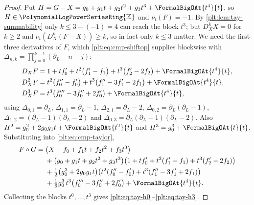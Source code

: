 \documentclass[11pt,oneside]{article}
\theoremstyle{plain}
\theoremstyle{definition}
\theoremstyle{remark}
\newcommand{\K}{\mathbb{K}}
\newcommand{\PLpow}{\PolynomialLogPowerSeriesRing{\K}}   %
\newcommand{\ordt}{\nu_{t}}                              %
\newcommand{\DX}{D_{X}}                                  %
\newcommand{\shiftop}[2]{\Delta_{#1,#2}}                 %
\newcommand{\compose}{\mathbin{\circ}}
\begin{document}
\begin{proof}
Put \(H=G-X=g_{0}+g_{1}t+g_{2}t^{2}+g_{3}t^{3}+\FormalBigOAt{t^{4}}{t}\), so
\(H\in\PLpow\) and \(\ordt(F)=-1\).  By
\cref{plt:lem:tay-summability} only \(k\le 3-(-1)=4\) can reach the block
\(t^{3}\); but \(\DX^{k}X=0\) for \(k\ge2\) and
\(\ordt(\DX^{k}(F-X))\ge k\), so in fact only \(k\le3\) matter.  We need the
first three derivatives of \(F\), which \eqref{plt:eq:cmp-shiftop} supplies
blockwise with \(\shiftop{n}{k}=\prod_{j=0}^{k-1}(\partial_L-n-j)\):
\begin{align*}
 \DX F&=1+t f_{0}'+t^{2}\bigl(f_{1}'-f_{1}\bigr)
        +t^{3}\bigl(f_{2}'-2f_{2}\bigr)+\FormalBigOAt{t^{4}}{t},\\
 \DX^{2}F&=t^{2}\bigl(f_{0}''-f_{0}'\bigr)
        +t^{3}\bigl(f_{1}''-3f_{1}'+2f_{1}\bigr)+\FormalBigOAt{t^{4}}{t},\\
 \DX^{3}F&=t^{3}\bigl(f_{0}'''-3f_{0}''+2f_{0}'\bigr)
        +\FormalBigOAt{t^{4}}{t},
\end{align*}
using \(\shiftop{0}{1}=\partial_L\), \(\shiftop{1}{1}=\partial_L-1\),
\(\shiftop{2}{1}=\partial_L-2\), \(\shiftop{0}{2}=\partial_L(\partial_L-1)\),
\(\shiftop{1}{2}=(\partial_L-1)(\partial_L-2)\) and
\(\shiftop{0}{3}=\partial_L(\partial_L-1)(\partial_L-2)\).  Also
\(H^{2}=g_{0}^{2}+2g_{0}g_{1}t+\FormalBigOAt{t^{2}}{t}\) and
\(H^{3}=g_{0}^{3}+\FormalBigOAt{t}{t}\).  Substituting into
\eqref{plt:eq:cmp-taylor},
\begin{align*}
 F\compose G
 ={}&\bigl(X+f_{0}+f_{1}t+f_{2}t^{2}+f_{3}t^{3}\bigr)\\
 &+\bigl(g_{0}+g_{1}t+g_{2}t^{2}+g_{3}t^{3}\bigr)
   \bigl(1+tf_{0}'+t^{2}(f_{1}'-f_{1})+t^{3}(f_{2}'-2f_{2})\bigr)\\
 &+\tfrac12\bigl(g_{0}^{2}+2g_{0}g_{1}t\bigr)
   \bigl(t^{2}(f_{0}''-f_{0}')+t^{3}(f_{1}''-3f_{1}'+2f_{1})\bigr)\\
 &+\tfrac16 g_{0}^{3}\,t^{3}\bigl(f_{0}'''-3f_{0}''+2f_{0}'\bigr)
   +\FormalBigOAt{t^{4}}{t}.
\end{align*}
Collecting the blocks \(t^{0},\ldots,t^{3}\) gives
\eqref{plt:eq:tay-h0}--\eqref{plt:eq:tay-h3}.
\end{proof}
\end{document}
